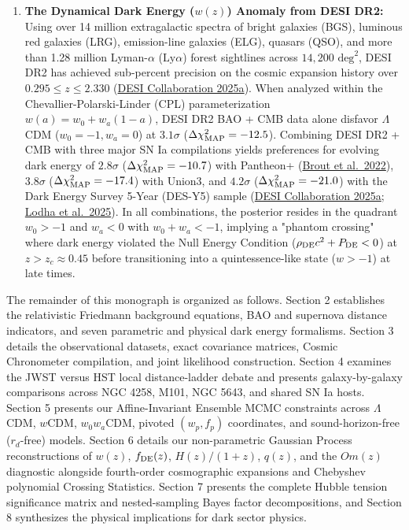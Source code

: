 \documentclass[11pt,letterpaper]{article}
\begin{document}
\begin{enumerate}
    \item \textbf{The Dynamical Dark Energy ($w(z)$) Anomaly from DESI DR2:} Using over 14 million extragalactic spectra of bright galaxies (BGS), luminous red galaxies (LRG), emission-line galaxies (ELG), quasars (QSO), and more than 1.28 million Lyman-$\alpha$ ($\text{Ly}\alpha$) forest sightlines across $14,200\text{ deg}^2$, DESI DR2 has achieved sub-percent precision on the cosmic expansion history over $0.295 \le z \le 2.330$ (\href{https://arxiv.org/abs/2503.14738}{DESI Collaboration 2025a}). When analyzed within the Chevallier-Polarski-Linder (CPL) parameterization $w(a) = w_0 + w_a(1-a)$, DESI DR2 BAO + CMB data alone disfavor $\Lambda$CDM ($w_0=-1, w_a=0$) at $3.1\sigma$ ($\Delta\chi^2_{\rm MAP} = -12.5$). Combining DESI DR2 + CMB with three major SN Ia compilations yields preferences for evolving dark energy of $2.8\sigma$ ($\Delta\chi^2_{\rm MAP} = -10.7$) with Pantheon+ (\href{https://arxiv.org/abs/2202.04077}{Brout et al.\ 2022}), $3.8\sigma$ ($\Delta\chi^2_{\rm MAP} = -17.4$) with Union3, and $4.2\sigma$ ($\Delta\chi^2_{\rm MAP} = -21.0$) with the Dark Energy Survey 5-Year (DES-Y5) sample (\href{https://arxiv.org/abs/2503.14738}{DESI Collaboration 2025a}; \href{https://arxiv.org/abs/2503.14743}{Lodha et al.\ 2025}). In all combinations, the posterior resides in the quadrant $w_0 > -1$ and $w_a < 0$ with $w_0 + w_a < -1$, implying a "phantom crossing" where dark energy violated the Null Energy Condition ($\rho_{\rm DE} c^2 + P_{\rm DE} < 0$) at $z > z_c \approx 0.45$ before transitioning into a quintessence-like state ($w > -1$) at late times.
\end{enumerate}

The remainder of this monograph is organized as follows. Section 2 establishes the relativistic Friedmann background equations, BAO and supernova distance indicators, and seven parametric and physical dark energy formalisms. Section 3 details the observational datasets, exact covariance matrices, Cosmic Chronometer compilation, and joint likelihood construction. Section 4 examines the JWST versus HST local distance-ladder debate and presents galaxy-by-galaxy comparisons across NGC 4258, M101, NGC 5643, and shared SN Ia hosts. Section 5 presents our Affine-Invariant Ensemble MCMC constraints across $\Lambda$CDM, $w$CDM, $w_0 w_a$CDM, pivoted $(w_p, f_p)$ coordinates, and sound-horizon-free ($r_d$-free) models. Section 6 details our non-parametric Gaussian Process reconstructions of $w(z)$, $f_{\rm DE}(z)$, $H(z)/(1+z)$, $q(z)$, and the $Om(z)$ diagnostic alongside fourth-order cosmographic expansions and Chebyshev polynomial Crossing Statistics. Section 7 presents the complete Hubble tension significance matrix and nested-sampling Bayes factor decompositions, and Section 8 synthesizes the physical implications for dark sector physics.
\end{document}
